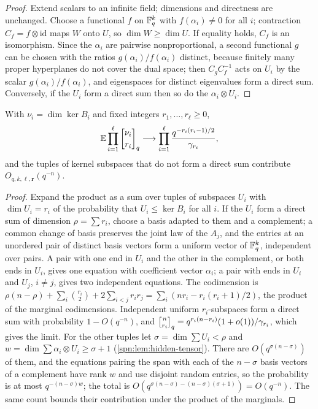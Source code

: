 \begin{proof}
Extend scalars to an infinite field; dimensions and directness are unchanged. Choose a functional $f$
on $\mathbb{F}_q^k$ with $f(\alpha_i)\ne0$ for all $i$; contraction $C_f=f\otimes\mathrm{id}$ maps $W$ onto
$U$, so $\dim W\ge\dim U$. If equality holds, $C_f$ is an isomorphism. Since the $\alpha_i$ are
pairwise nonproportional, a second functional $g$ can be chosen with the ratios $g(\alpha_i)/f(\alpha_i)$
distinct, because finitely many proper hyperplanes do not cover the dual space; then $C_gC_f^{-1}$
acts on $U_i$ by the scalar $g(\alpha_i)/f(\alpha_i)$, and eigenspaces for distinct eigenvalues form a
direct sum. Conversely, if the $U_i$ form a direct sum then so do the $\alpha_i\otimes U_i$.
\end{proof}

\begin{lemma}\label{spn:lem:hidden-mixed}
With $\nu_i=\dim\ker B_i$ and fixed integers $r_1,\dots,r_\ell\ge0$,
\[
 \spnE\prod_{i=1}^\ell\spnqbin{\nu_i}{r_i}{q}\longrightarrow\prod_{i=1}^\ell\frac{q^{-r_i(r_i-1)/2}}{\gamma_{r_i}},
\]
and the tuples of kernel subspaces that do not form a direct sum contribute
$O_{q,k,\ell,\boldsymbol r}(q^{-n})$.
\end{lemma}

\begin{proof}
Expand the product as a sum over tuples of subspaces $U_i$ with $\dim U_i=r_i$ of the probability that
$U_i\le\ker B_i$ for all $i$. If the $U_i$ form a direct sum of dimension $\rho=\sum r_i$, choose a basis
adapted to them and a complement; a common change of basis preserves the joint law of the $A_j$, and
the entries at an unordered pair of distinct basis vectors form a uniform vector of $\mathbb{F}_q^k$,
independent over pairs. A pair with one end in $U_i$ and the other in the complement, or both ends in
$U_i$, gives one equation with coefficient vector $\alpha_i$; a pair with ends in $U_i$ and $U_j$,
$i\ne j$, gives two independent equations. The codimension is
$\rho(n-\rho)+\sum_i\binom{r_i}2+2\sum_{i<j}r_ir_j=\sum_i(nr_i-r_i(r_i+1)/2)$, the product of the
marginal codimensions. Independent uniform $r_i$-subspaces form a direct sum with probability
$1-O(q^{-n})$, and $\spnqbin n{r_i}{q}=q^{r_i(n-r_i)}(1+o(1))/\gamma_{r_i}$, which gives the limit.
For the other tuples let $\sigma=\dim\sum U_i<\rho$ and $w=\dim\sum\alpha_i\otimes U_i\ge\sigma+1$
(\cref{spn:lem:hidden-tensor}). There are $O(q^{\sigma(n-\sigma)})$ of them, and the equations pairing
the span with each of the $n-\sigma$ basis vectors of a complement have rank $w$ and use disjoint
random entries, so the probability is at most $q^{-(n-\sigma)w}$; the total is
$O(q^{\sigma(n-\sigma)-(n-\sigma)(\sigma+1)})=O(q^{-n})$. The same count bounds their contribution under
the product of the marginals.
\end{proof}

